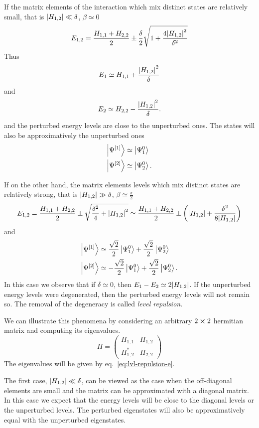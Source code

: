 \documentclass[../thesis.tex]{subfiles}
\theoremstyle{definition}
\begin{document}
If the matrix elements of the interaction which mix distinct states are relatively small,
that is \(\abs{H_{1,2}} \ll \delta \), \(\beta \simeq 0\)
\[
  E_{1,2} = \frac{H_{1,1} + H_{2,2}}{2} \pm
            \frac{\delta}{2} \sqrt{1 + \frac{4 \abs{H_{1,2}}^2}{\delta^2}}
\]
Thus
\[
  E_1 \simeq H_{1,1} + \frac{\abs{H_{1,2}}^2}{\delta}
\]
and
\[
  E_2 \simeq H_{2,2} - \frac{\abs{H_{1,2}}^2}{\delta}.
\]
and the perturbed energy levels are close to the unperturbed ones.
The states will also be approximatively the unperturbed ones
\begin{align*}
  \ket{\Psi^{[1]}} &\simeq \ket{\Psi_1^0} \\
  \ket{\Psi^{[2]}} &\simeq \ket{\Psi_2^0}.
\end{align*}

If on the other hand, the matrix elements levels which mix distinct states are
relatively strong, that is \(\abs{H_{1,2}} \gg \delta \), \(\beta \simeq \frac{\pi}{2}\)
\[
  E_{1,2} = \frac{H_{1,1} + H_{2,2}}{2} \pm
            \sqrt{\frac{\delta^2}{4} + \abs{H_{1,2}}^2}
          \simeq \frac{H_{1,1} + H_{2,2}}{2} \pm
          \left(\abs{H_{1,2}} + \frac{\delta^2}{8\abs{H_{1,2}}}\right)
\]
and
\begin{align*}
  \ket{\Psi^{[1]}} &\simeq \frac{\sqrt{2}}{2} \ket{\Psi_1^0} + \frac{\sqrt{2}}{2} \ket{\Psi_2^0} \\
  \ket{\Psi^{[2]}} &\simeq -\frac{\sqrt{2}}{2} \ket{\Psi_1^0} + \frac{\sqrt{2}}{2} \ket{\Psi_2^0}.
\end{align*}
In this case we observe that if \(\delta \simeq 0\),
then \(E_1 - E_2 \simeq 2\abs{H_{1,2}}\). If the unperturbed energy levels were
degenerated, then the perturbed energy levels will not remain so. The removal
of the degeneracy is called \emph{level repulsion}.

We can illustrate this phenomena by considering an arbitrary \(2 \cross 2\)
hermitian matrix and computing its eigenvalues.
\[
  H = \begin{pmatrix}
  H_{1,1}   & H_{1,2} \\
  H_{1,2}^* & H_{2,2}
  \end{pmatrix}
\]
The eigenvalues will be given by eq.~\eqref{eq:lvl-repulsion-e}.

The first case, \(\abs{H_{1,2}} \ll \delta \), can be viewed as the case when
the off-diagonal elements are small and the matrix can be approximated with
a diagonal matrix. In this case we expect that the energy levels will be close
to the diagonal levels or the unperturbed levels. The perturbed eigenstates
will also be approximatively equal with the unperturbed eigenstates.
\end{document}

